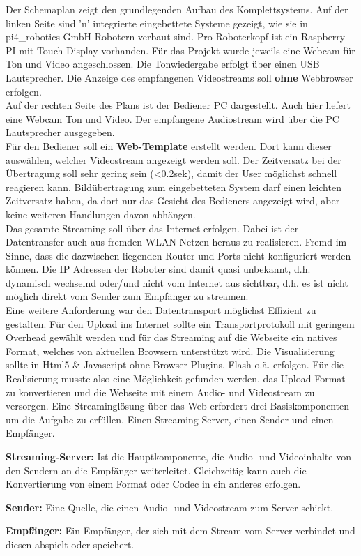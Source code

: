 Der Schemaplan zeigt den grundlegenden Aufbau des Komplettsystems. Auf der linken Seite sind 'n' integrierte eingebettete Systeme gezeigt, wie sie in pi4\_robotics GmbH Robotern verbaut sind. Pro Roboterkopf ist ein Raspberry PI mit Touch-Display vorhanden. Für das Projekt wurde jeweils eine Webcam für Ton und Video angeschlossen. Die Tonwiedergabe erfolgt über einen USB Lautsprecher. Die Anzeige des empfangenen Videostreams soll \textbf{ohne} Webbrowser erfolgen.\\
Auf der rechten Seite des Plans ist der Bediener PC dargestellt. Auch hier liefert eine Webcam Ton und Video. Der empfangene Audiostream wird über die PC Lautsprecher ausgegeben.\\
Für den Bediener soll ein \textbf{Web-Template} erstellt werden. Dort kann dieser auswählen, welcher Videostream angezeigt werden soll. Der Zeitversatz bei der Übertragung soll sehr gering sein 
(<0.2sek), damit der User möglichst schnell reagieren kann. Bildübertragung zum eingebetteten System darf einen leichten Zeitversatz haben, da dort nur das Gesicht des Bedieners angezeigt wird, aber keine weiteren Handlungen davon abhängen.\\
Das gesamte Streaming soll über das Internet erfolgen. Dabei ist der Datentransfer auch aus 
fremden WLAN Netzen heraus zu realisieren. Fremd im Sinne, dass die dazwischen liegenden Router und Ports nicht konfiguriert werden können. Die IP Adressen der Roboter sind damit quasi unbekannt, d.h. dynamisch wechselnd oder/und nicht vom Internet aus sichtbar, d.h. es ist nicht möglich direkt vom Sender zum Empfänger zu streamen.\\
Eine weitere Anforderung war den Datentransport möglichst Effizient zu gestalten. Für den Upload ins Internet sollte ein Transportprotokoll mit geringem Overhead gewählt werden und für das Streaming auf die Webseite ein natives Format, welches von aktuellen Browsern unterstützt wird. Die Visualisierung sollte in Html5 \& Javascript ohne Browser-Plugins, Flash o.ä. erfolgen. Für die Realisierung musste also eine Möglichkeit gefunden werden, das Upload Format zu konvertieren und die Webseite mit einem Audio- und Videostream zu versorgen. Eine Streaminglösung über das Web erfordert drei Basiskomponenten um die Aufgabe zu erfüllen. Einen Streaming Server, einen Sender und einen Empfänger.

\textbf{Streaming-Server:} 
Ist die Hauptkomponente, die Audio- und Videoinhalte von den Sendern an die Empfänger weiterleitet. Gleichzeitig kann auch die Konvertierung von einem Format oder Codec in ein anderes erfolgen.

\textbf{Sender:} Eine Quelle, die einen Audio- und Videostream zum Server schickt. 

\textbf{Empfänger:} Ein Empfänger, der sich mit dem Stream vom Server verbindet und diesen abspielt oder speichert.